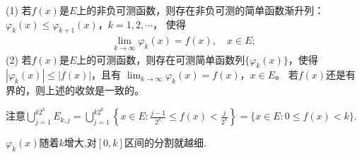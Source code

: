 \documentclass[../../main.tex]{subfiles}%
\begin{document}
\begin{theorem}[简单函数逼近定理]\label{theorem:简单函数逼近定理}
(1) 若$f(x)$是$E$上的非负可测函数，则存在非负可测的简单函数渐升列：
$\varphi_k(x) \leqslant \varphi_{k + 1}(x)$，$k = 1, 2, \cdots$，
使得
\begin{align}
\lim_{k \to \infty} \varphi_k(x) = f(x), \quad x \in E; \label{eq:3.5}
\end{align}
(2) 若$f(x)$是$E$上的可测函数，则存在可测简单函数列$\{\varphi_k(x)\}$，使得$|\varphi_k(x)| \leqslant |f(x)|$，且有
$\lim_{k \to \infty} \varphi_k(x) = f(x)$，$x \in E$。
若$f(x)$还是有界的，则上述的收敛是一致的。
\end{theorem}
\begin{remark}
注意$\bigcup_{j=1}^{k2^k}E_{k, j}=\bigcup_{j=1}^{k2^k}\left\{x \in E: \frac{j - 1}{2^k} \leqslant f(x) < \frac{j}{2^k} \right\}=\{x\in E:0\leqslant f(x)<k\}.$
\end{remark}
\begin{note}
$\varphi_k(x)$随着$k$增大,对$[0,k]$区间的分割就越细.
\end{note}
\end{document}
